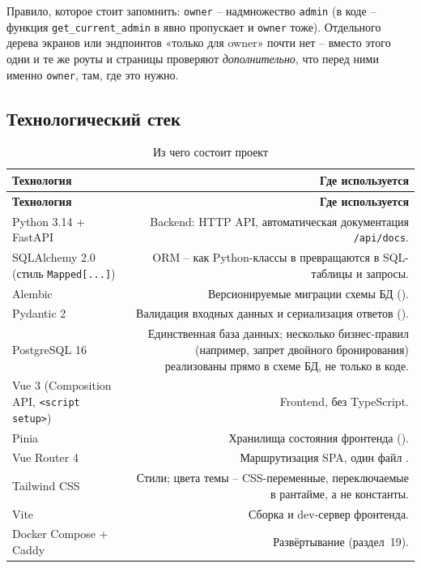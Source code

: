 Правило, которое стоит запомнить: \texttt{owner} -- надмножество
\texttt{admin} (в коде -- функция \texttt{get_current_admin} в
 явно пропускает и
\texttt{owner} тоже). Отдельного дерева экранов или эндпоинтов «только
для owner» почти нет -- вместо этого одни и те же роуты и страницы
проверяют \emph{дополнительно}, что перед ними именно \texttt{owner}, там,
где это нужно.

\subsection*{Технологический стек}

\begin{xltabular}{\textwidth}{M D}
\caption{Из чего состоит проект} \\
\hline
\textbf{Технология} & \textbf{Где используется} \\
\hline
\endfirsthead
\hline
\textbf{Технология} & \textbf{Где используется} \\
\hline
\endhead
\hline
\endfoot
Python 3.14 + FastAPI & Backend: HTTP API, автоматическая документация
  \texttt{/api/docs}. \\
SQLAlchemy 2.0 (стиль \texttt{Mapped[...]}) & ORM -- как Python-классы в
   превращаются в SQL-таблицы и запросы. \\
Alembic & Версионируемые миграции схемы БД (). \\
Pydantic 2 & Валидация входных данных и сериализация ответов
  (). \\
PostgreSQL 16 & Единственная база данных; несколько бизнес-правил
  (например, запрет двойного бронирования) реализованы прямо в схеме БД,
  не только в коде. \\
Vue 3 (Composition API, \texttt{<script setup>}) & Frontend, без
  TypeScript. \\
Pinia & Хранилища состояния фронтенда (). \\
Vue Router 4 & Маршрутизация SPA, один файл
  . \\
Tailwind CSS & Стили; цвета темы -- CSS-переменные, переключаемые в
  рантайме, а не константы. \\
Vite & Сборка и dev-сервер фронтенда. \\
Docker Compose + Caddy & Развёртывание (раздел~19). \\
\end{xltabular}

